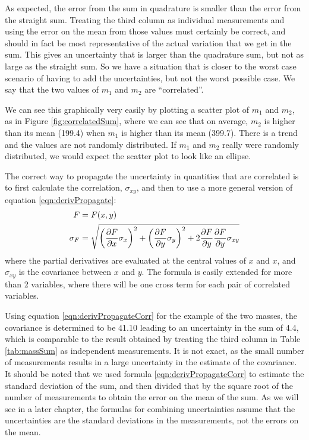 As expected, the error from the sum in quadrature is smaller than the error from the straight sum. Treating the third column as individual measurements and using the error on the mean from those values must certainly be correct, and should in fact be most representative of the actual variation that we get in the sum. This gives an uncertainty that is larger than the quadrature sum, but not as large as the straight sum. So we have a situation that is closer to the worst case scenario of having to add the uncertainties, but not the worst possible case. We say that the two values of $m_1$ and $m_2$ are ``correlated''. 

We can see this graphically very easily by plotting a scatter plot of $m_1$ and $m_2$, as in Figure \ref{fig:correlatedSum}, where we can see that on average, $m_2$ is higher than its mean (199.4) when $m_1$ is higher than its mean (399.7). There is a trend and the values are not randomly distributed. If $m_1$ and $m_2$ really were randomly distributed, we would expect the scatter plot to look like an ellipse. 


The correct way to propagate the uncertainty in quantities that are correlated is to first calculate the correlation, $\sigma_{xy}$, and then to use a more general version of equation \ref{eqn:derivPropagate}:
\begin{align}
\label{eqn:derivPropagateCorr}
F&=F(x,y)\nonumber\\
\sigma_F &= \sqrt{\left(\frac{\partial F}{\partial x}\sigma_x\right)^2 + \left(\frac{\partial F}{\partial y} \sigma_y\right)^2+2\frac{\partial F}{\partial y}\frac{\partial F}{\partial y}\sigma_{xy}}
\end{align}
where the partial derivatives are evaluated at the central values of $x$ and $x$, and $\sigma_{xy}$ is the covariance between $x$ and $y$. The formula is easily extended for more than 2 variables, where there will be one cross term for each pair of correlated variables.

Using equation \ref{eqn:derivPropagateCorr} for the example of the two masses, the covariance is determined to be 41.10 leading to an uncertainty in the sum of 4.4, which is comparable to the result obtained by treating the third column in Table \ref{tab:massSum} as independent measurements. It is not exact, as the small number of measurements results in a large uncertainty in the estimate of the covariance. It should be noted that we used formula \ref{eqn:derivPropagateCorr} to estimate the standard deviation of the sum, and then divided that by the square root of the number of measurements to obtain the error on the mean of the sum. As we will see in a later chapter, the formulas for combining uncertainties assume that the uncertainties are the standard deviations in the measurements, not the errors on the mean. 

